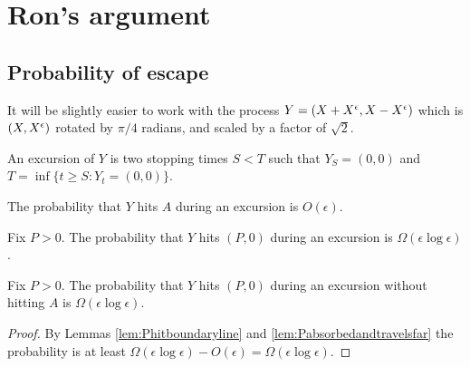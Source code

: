 {
\section{Ron's argument}

\newcommand{\bandwidth}{\delta}
\newcommand{\rotproc}{Y}

\newcommand{\union}{\cup}
\renewcommand{\L}{L^+ \union L^-}
\newcommand{\Le}{L^\epsilon}

\subsection{Probability of escape}

It will be slightly easier to work with the process $\rotproc =
(\sampled + \resamplede, \sampled - \resamplede)$ which is $(X,
X^{\epsilon})$ rotated by $\pi / 4$ radians, and scaled by a factor of
$\sqrt{2}$.

\newcommand{\boundarylines}{A}

\begin{definition}
  An excursion of $Y$ is two stopping times $S < T$ such that $Y_S =
  (0,0)$ and $T = \inf\{ t \ge S : Y_t = (0,0) \}$.  
\end{definition}

\begin{lemma}
  \label{lem:Phitboundaryline}
  The probability that $Y$ hits $\boundarylines$ during an excursion
  is $O(\epsilon)$.
\end{lemma}

\newcommand{\Omegaeloge}{\Omega(\epsilon\log\epsilon)}

\begin{lemma}
  \label{lem:Pabsorbedandtravelsfar}
  Fix $P > 0$.  The probability that $Y$ hits $(P,0)$ during an
  excursion is $\Omegaeloge$.
\end{lemma}

\begin{lemma}
  Fix $P > 0$.  The probability that $Y$ hits $(P,0)$ during an
  excursion without hitting $A$ is $\Omegaeloge$.
\end{lemma}

\begin{proof}
  By Lemmas \ref{lem:Phitboundaryline} and
  \ref{lem:Pabsorbedandtravelsfar} the probability is at least
  $\Omegaeloge - O(\epsilon) = \Omegaeloge$.
\end{proof}

}
